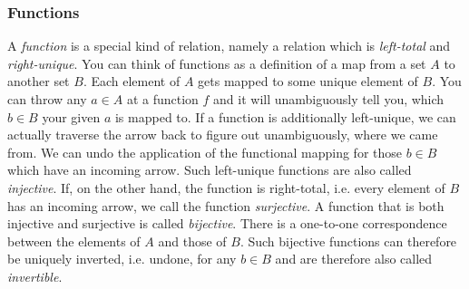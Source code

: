 \subsubsection{Functions} A \emph{function} is a special kind of relation, namely a relation which is \emph{left-total} and \emph{right-unique}. You can think of functions as a definition of a map from a set $A$ to another set $B$. Each element of $A$ gets mapped to some unique element of $B$. You can throw any $a \in A$ at a function $f$ and it will unambiguously tell you, which $b \in B$ your given $a$ is mapped to. If a function is additionally left-unique, we can actually traverse the arrow back to figure out unambiguously, where we came from. We can undo the application of the functional mapping for those $b \in B$ which have an incoming arrow. Such left-unique functions are also called \emph{injective}. If, on the other hand, the function is right-total, i.e. every element of $B$ has an incoming arrow, we call the function \emph{surjective}. A function that is both injective and surjective is called \emph{bijective}. There is a one-to-one correspondence between the elements of $A$ and those of $B$. Such bijective functions can therefore be uniquely inverted, i.e. undone, for any $b \in B$ and are therefore also called \emph{invertible}.



